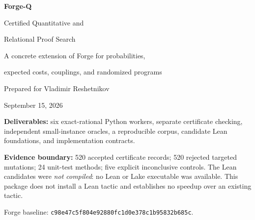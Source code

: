 \documentclass[11pt,letterpaper]{article}
\theoremstyle{definition}\newtheorem{definition}[theorem]{Definition}
\theoremstyle{remark}\newtheorem{remark}[theorem]{Remark}
\newcommand{\code}[1]{\texttt{#1}}
\begin{document}
\begin{titlepage}
\vspace*{0.7in}
{\color{ink}\Huge\bfseries Forge-Q\par}
\vspace{0.35in}
{\LARGE Certified Quantitative and\par Relational Proof Search\par}
\vspace{0.3in}
{\large A concrete extension of Forge for probabilities,\par expected costs, couplings, and randomized programs\par}
\vspace{0.5in}
{\large Prepared for Vladimir Reshetnikov\par}
{\large September 15, 2026\par}
\vfill
\noindent\textbf{Deliverables:} six exact-rational Python workers, separate certificate checking, independent small-instance oracles, a reproducible corpus, candidate Lean foundations, and implementation contracts.

\noindent\textbf{Evidence boundary:} 520 accepted certificate records; 520 rejected targeted mutations; 24 unit-test methods; five explicit inconclusive controls. The Lean candidates were \emph{not compiled}: no Lean or Lake executable was available. This package does not install a Lean tactic and establishes no speedup over an existing tactic.

\vspace{0.2in}
\noindent\small Forge baseline: \code{c98e47c5f804e92880fc1d0e378c1b95832b685c}.\par
\end{titlepage}
\end{document}
